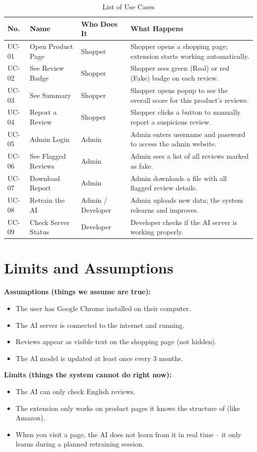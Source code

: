 \documentclass[10pt, a4paper]{report}
\begin{document}
\begin{table}[H]
\centering
\caption{List of Use Cases}
\begin{tabularx}{\textwidth}{lllX}
\toprule
\textbf{No.} & \textbf{Name} & \textbf{Who Does It} & \textbf{What Happens} \\
\midrule
UC-01 & Open Product Page & Shopper & Shopper opens a shopping page; extension starts working automatically. \\
UC-02 & See Review Badge & Shopper & Shopper sees green (Real) or red (Fake) badge on each review. \\
UC-03 & See Summary & Shopper & Shopper opens popup to see the overall score for this product's reviews. \\
UC-04 & Report a Review & Shopper & Shopper clicks a button to manually report a suspicious review. \\
UC-05 & Admin Login & Admin & Admin enters username and password to access the admin website. \\
UC-06 & See Flagged Reviews & Admin & Admin sees a list of all reviews marked as fake. \\
UC-07 & Download Report & Admin & Admin downloads a file with all flagged review details. \\
UC-08 & Retrain the AI & Admin / Developer & Admin uploads new data; the system relearns and improves. \\
UC-09 & Check Server Status & Developer & Developer checks if the AI server is working properly. \\
\bottomrule
\end{tabularx}
\end{table}

\section{Limits and Assumptions}

\textbf{Assumptions (things we assume are true):}
\begin{itemize}
  \item The user has Google Chrome installed on their computer.
  \item The AI server is connected to the internet and running.
  \item Reviews appear as visible text on the shopping page (not hidden).
  \item The AI model is updated at least once every 3 months.
\end{itemize}

\textbf{Limits (things the system cannot do right now):}
\begin{itemize}
  \item The AI can only check English reviews.
  \item The extension only works on product pages it knows the structure of (like Amazon).
  \item When you visit a page, the AI does not learn from it in real time -- it only learns during a planned retraining session.
\end{itemize}
\end{document}

